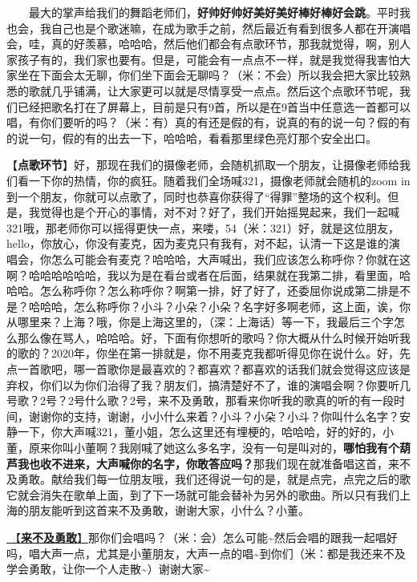 \documentclass[]{ctexbook}
\begin{document}
  最大的掌声给我们的舞蹈老师们，\textbf{好帅好帅好美好美好棒好棒好会跳}。平时我也会，我自己也是个歌迷嘛，在成为歌手之前，然后最近有看到很多人都在开演唱会，哇，真的好羡慕，哈哈哈，然后他们都会有点歌环节，那我就觉得，啊，别人家孩子有的，我们家也要有。但是，可能会有一点点不一样，就是我觉得我害怕大家坐在下面会太无聊，你们坐下面会无聊吗？（米：不会）所以我会把大家比较熟悉的歌就几乎铺满，让大家更可以就是尽情享受一点点。然后这个点歌环节呢，我们已经把歌名打在了屏幕上，目前是只有9首，所以是在9首当中任意选一首都可以唱，有你们要听的吗？（米：有）真的有还是假的有，说真的有的说一句？假的有的说一句，假的有的出去一下，哈哈哈，看看那里绿色亮灯那个安全出口。

【\textbf{点歌环节}】好，那现在我们的摄像老师，会随机抓取一个朋友，让摄像老师给我们看一下你的热情，你的疯狂。随着我们全场喊321，摄像老师就会随机的zoom in到一个朋友，你就可以点歌了，同时也恭喜你获得了``得罪''整场的这个权利。但是，我觉得也是个开心的事情，对不对？好了，我们开始摇晃起来，我们一起喊321哦，那老师你可以摇得更快一点，来喽，54（米：321）好，就是这位朋友，hello，你放心，你没有麦克，因为麦克只有我有，对不起，认清一下这是谁的演唱会，你怎么可能会有麦克？哈哈哈，大声喊出，我们应该怎么称呼你？你就在这啊？哈哈哈哈哈哈，我以为是在看台或者在后面，结果就在我第二排，看里面，哈哈哈。怎么称呼你？怎么称呼你？啊第一排，好了好了，还委屈你说成第二排是不是？哈哈哈，怎么称呼你？小斗？小朵？小朵？名字好多啊老师，这上面，诶，你从哪里来？上海？哦，你是上海这里的，（深：上海话）等一下，我最后三个字怎么那么像在骂人，哈哈哈。好，下面有你想听的歌吗？你大概从什么时候开始听我的歌的？2020年，你坐在第一排就是，你不用麦克我都听得见你在说什么。好，先点一首歌吧，哪一首歌你是最喜欢的？都喜欢？都喜欢的话我们就会觉得这应该是弃权，你们以为你们治得了我？朋友们，搞清楚好不了，谁的演唱会啊？你要听几号歌？2号？2号什么歌？2号，来不及勇敢，那看来你听我的歌真的听的有一段时间，谢谢你的支持，谢谢，小小什么来着？小斗？小朵？小斗？你叫什么名字？安静一下，你大声喊321，董小姐，怎么这里还有埋梗的，哈哈哈，好的好的，小董，原来你叫小董啊？我刚喊了她这么多名字，没有一句是叫对的，\textbf{哪怕我有个葫芦我也收不进来，大声喊你的名字，你敢答应吗？}那我们现在就准备唱这首，来不及勇敢。献给我们每一位朋友哦，我们还得说一句的是，就是点完，点完之后的歌它就会消失在歌单上面，到了下一场就可能会替补为另外的歌曲。所以只有我们上海的朋友能听到这首来不及勇敢，谢谢大家，小什么？小董。

\hyperref[late-to-be-brave]{🎵【\textbf{来不及勇敢}】}那你们会唱吗？（米：会）怎么可能\textasciitilde 然后会唱的跟我一起唱好吗，唱大声一点，尤其是小董朋友，大声一点的唱\textasciitilde 到你们（米：都是我还来不及学会勇敢，让你一个人走散\textasciitilde）谢谢大家\textasciitilde{}
\end{document}
